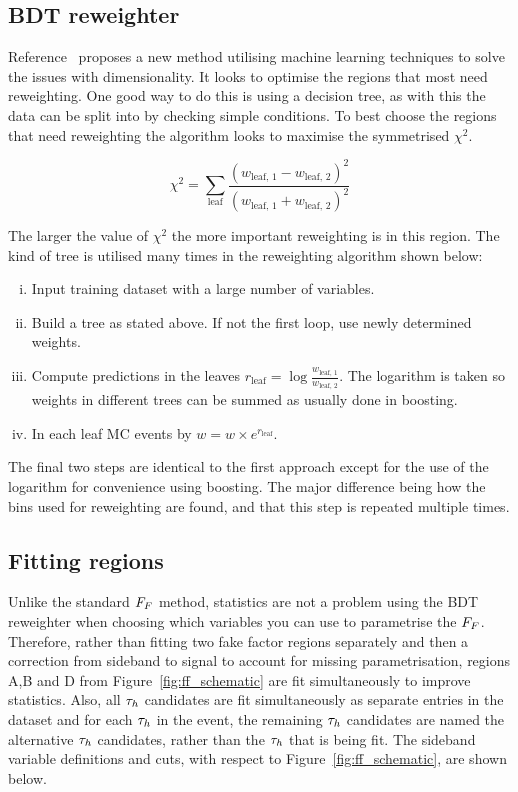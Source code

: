 \subsection{BDT reweighter}

Reference~\cite{Rogozhnikov:2016bdp} proposes a new method utilising machine learning techniques to solve the issues with dimensionality. 
It looks to optimise the regions that most need reweighting. 
One good way to do this is using a decision tree, as with this the data can be split into  by checking simple conditions.
To best choose the regions that need reweighting the algorithm looks to maximise the symmetrised $\chi^2$.

\begin{equation}
\chi^2 = \sum_{\text{leaf}} \frac{(w_{\text{leaf, 1}}-w_{\text{leaf, 2}})^2}{(w_{\text{leaf, 1}}+w_{\text{leaf, 2}})^2}
\end{equation}

The larger the value of $\chi^2$ the more important reweighting is in this region. 
The kind of tree is utilised many times in the reweighting algorithm shown below:

\begin{enumerate}[i)]
\item Input training dataset with a large number of variables.
\item Build a tree as stated above. If not the first loop, use newly determined weights.
\item Compute predictions in the leaves $r_{\text{leaf}} = \log\frac{w_{\text{leaf, 1}}}{w_{\text{leaf, 2}}}$. The logarithm is taken so weights in different trees can be summed as usually done in boosting.
\item In each leaf MC events by $w = w \times e^{r_{\text{leaf}}}$.
\end{enumerate}

The final two steps are identical to the first approach except for the use of the logarithm for convenience using boosting. 
The major difference being how the bins used for reweighting are found, and that this step is repeated multiple times. \\

\subsection{Fitting regions}

Unlike the standard $F_{F}$ method, statistics are not a problem using the \ac{BDT} reweighter when choosing which variables you can use to parametrise the $F_{F}$. 
Therefore, rather than fitting two fake factor regions separately and then a correction from sideband to signal to account for missing parametrisation, regions A,B and D from Figure~\ref{fig:ff_schematic} are fit simultaneously to improve statistics. 
Also, all $\tau_{h}$ candidates are fit simultaneously as separate entries in the dataset and for each $\tau_{h}$ in the event, the remaining $\tau_{h}$ candidates are named the alternative $\tau_{h}$ candidates, rather than the $\tau_{h}$ that is being fit. 
The sideband variable definitions and cuts, with respect to Figure~\ref{fig:ff_schematic}, are shown below. \\

